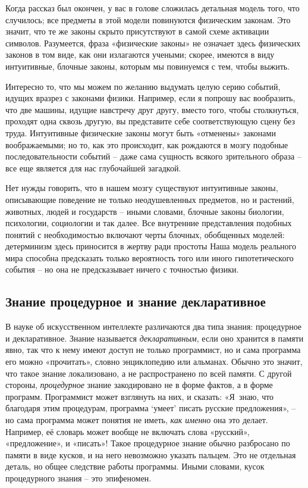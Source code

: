 \documentclass[../main.tex]{subfiles}
\begin{document}
Когда рассказ был окончен, у вас в голове сложилась детальная модель того, что случилось; все предметы в этой модели повинуются физическим законам. Это значит, что те же законы скрыто присутствуют в самой схеме активации символов. Разумеется, фраза «физические законы» не означает здесь физических законов в том виде, как они излагаются учеными; скорее, имеются в виду интуитивные, блочные законы, которым мы повинуемся с тем, чтобы выжить.

Интересно то, что мы можем по желанию выдумать целую серию событий, идущих вразрез с законами физики. Например, если я попрошу вас вообразить, что две машины, идущие навстречу друг другу, вместо того, чтобы столкнуться, проходят одна сквозь другую, вы представите себе соответствующую сцену без труда. Интуитивные физические законы могут быть «отменены» законами воображаемыми; но то, как это происходит, как рождаются в мозгу подобные последовательности событий \--- даже сама сущность всякого зрительного образа \--- все еще является для нас глубочайшей загадкой.

Нет нужды говорить, что в нашем мозгу существуют интуитивные законы, описывающие поведение не только неодушевленных предметов, но и растений, животных, людей и государств \--- иными словами, блочные законы биологии, психологии, социологии и так далее. Все внутренние представления подобных понятий с необходимостью включают черты блочных, обобщенных моделей: детерминизм здесь приносится в жертву ради простоты Наша модель реального мира способна предсказать только вероятность того или иного гипотетического события \--- но она не предсказывает ничего с точностью физики.


\subsection{Знание процедурное и знание декларативное}

В науке об искусственном интеллекте различаются два типа знания: процедурное и декларативное. Знание называется \emph{декларативным}, если оно хранится в памяти явно, так что к нему имеют доступ не только программист, но и сама программа его можно «прочитать», словно энциклопедию или альманах. Обычно это значит, что такое знание локализовано, а не распространено по всей памяти. С другой стороны, \emph{процедурное} знание закодировано не в форме фактов, а в форме программ. Программист может взглянуть на них, и сказать: «Я~знаю, что благодаря этим процедурам, программа \enquote*{умеет} писать русские предложения», \--- но сама программа может понятия не иметь, \emph{как именно} она это делает. Например, её словарь может вообще не включать слова «русский», «предложение», и «писать»! Такое процедурное знание обычно разбросано по памяти в виде кусков, и на него невозможно указать пальцем. Это не отдельная деталь, но общее следствие работы программы. Иными словами, кусок процедурного знания \--- это эпифеномен.
\end{document}
